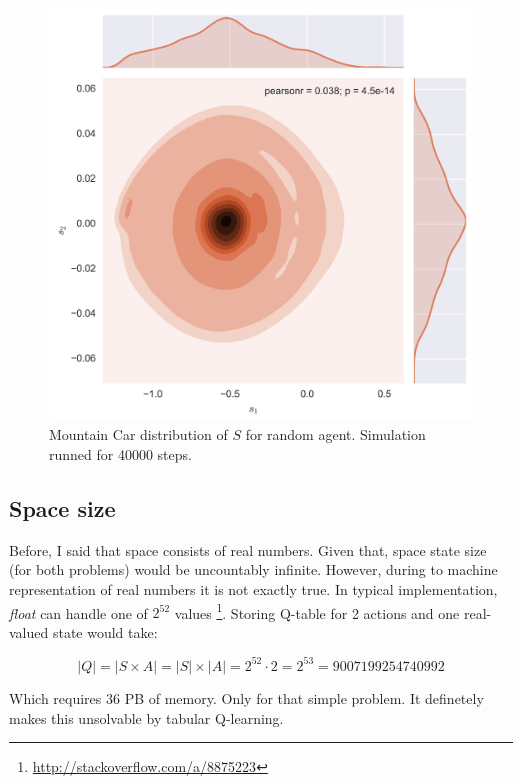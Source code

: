 \documentclass[12pt]{article}
\begin{document}
\begin{figure}[h]
\includegraphics[width=\textwidth]{exploratory_mountaincar.png} 
\centering
\caption{Mountain Car distribution of $S$ for random agent. Simulation runned for 40000 steps.}
\end{figure}

\subsection{Space size}

Before, I said that space consists of real numbers. Given that, space state size (for both problems) would be uncountably infinite. However, during to machine representation of real numbers it is not exactly true. In typical implementation, \emph{float} can handle one of $2^{52}$ values \footnote{\url{http://stackoverflow.com/a/8875223}}. Storing Q-table for 2 actions and one real-valued state would take:



\begin{equation}
|Q| = |S \times A| = |S| \times |A| = 2^{52} \cdot 2 = 2^{53} = 9007199254740992
\end{equation}

Which requires 36 PB of memory. Only for that simple problem. It definetely makes this unsolvable by tabular Q-learning.
\end{document}
